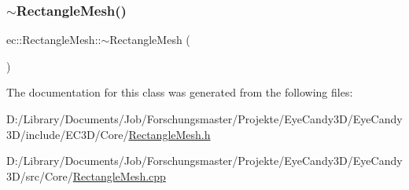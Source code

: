 \subsubsection{\texorpdfstring{$\sim$\+Rectangle\+Mesh()}{~RectangleMesh()}}
{\footnotesize\ttfamily ec\+::\+Rectangle\+Mesh\+::$\sim$\+Rectangle\+Mesh (\begin{DoxyParamCaption}{ }\end{DoxyParamCaption})\hspace{0.3cm}{\ttfamily [virtual]}}



The documentation for this class was generated from the following files\+:\begin{DoxyCompactItemize}
\item 
D\+:/\+Library/\+Documents/\+Job/\+Forschungsmaster/\+Projekte/\+Eye\+Candy3\+D/\+Eye\+Candy3\+D/include/\+E\+C3\+D/\+Core/\mbox{\hyperlink{_rectangle_mesh_8h}{Rectangle\+Mesh.\+h}}\item 
D\+:/\+Library/\+Documents/\+Job/\+Forschungsmaster/\+Projekte/\+Eye\+Candy3\+D/\+Eye\+Candy3\+D/src/\+Core/\mbox{\hyperlink{_rectangle_mesh_8cpp}{Rectangle\+Mesh.\+cpp}}\end{DoxyCompactItemize}
